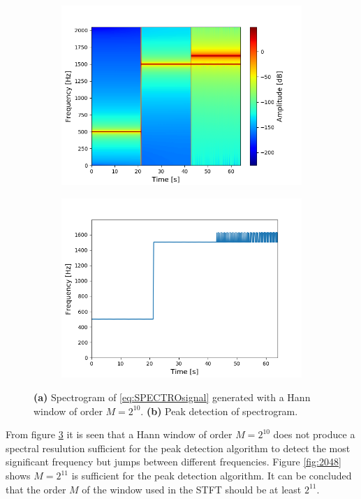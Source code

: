 \begin{figure}[H]
\centering
\begin{subfigure}{0.49\textwidth}
\centering
\includegraphics[width=\textwidth]{figures/validation/stft/peak/spectro1024.png}
\caption{}
\label{fig:1024spec}
\end{subfigure}
\begin{subfigure}{0.49\textwidth}
\centering
\includegraphics[width=\textwidth]{figures/validation/stft/peak/peak1024.png}
\caption{}
\label{fig:1024peak}
\end{subfigure}
\caption{\textbf{(a)} Spectrogram of \eqref{eq:SPECTROsignal} generated with a Hann window of order $M=2^{10}$. \textbf{(b)} Peak detection of spectrogram.}
\label{fig:1024}
\end{figure}
From figure \ref{fig:1024} it is seen that a Hann window of order $M=2^{10}$ does not produce a spectral resulution sufficient for the peak detection algorithm to detect the most significant frequency but jumps between different frequencies. Figure \ref{fig:2048} shows $M=2^{11}$ is sufficient for the peak detection algorithm. It can be concluded that the order $M$ of the window used in the STFT should be at least $2^{11}$.
